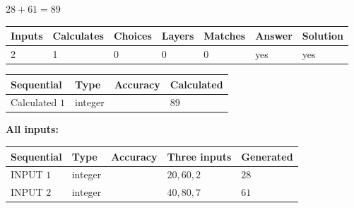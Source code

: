 \documentclass[12pt]{article}
\begin{document}
 
\noindent{}
 
 

$ %
28 +  %
61=   %
89$
 
 
\noindent{}
 
 

 
   
   
   
   
\noindent\begin{tabular}{|l|l|l|l|l|l|l|}
 \hline
Inputs & Calculates & Choices & Layers & Matches & Answer & Solution \\ \hline
 2  & 
 1  & 
 0
  & 
 0  & 
 0  & 
  yes & 
  yes 
  \\ \hline
 \end{tabular}
   
   
   
   
\noindent{}
   
   
  
  
\noindent\begin{tabular}{|l|l|l|l|}
\hline
 Sequential & Type & Accuracy & Calculated \\ 
\hline
 
 
  Calculated $  1 $ & integer &  & 
  $ 89 $ 
 \\  \hline  
 \end{tabular}
   
   
   
   
\noindent\vspace{0.1in}\hspace{-0.08in} {\textbf{\Large{All inputs: }}}
   
   
  
  
\noindent\begin{tabular}{|l|l|l|l|l|}
\hline
 Sequential & Type & Accuracy & Three inputs & Generated \\ 
\hline
 
 
  INPUT $  1 $ & integer &  & $
 20
 , 
 60
 , 
 2
 $ & $ 28 $ 
 \\  \hline  
 
 
  INPUT $  2 $ & integer &  & $
 40
 , 
 80
 , 
 7
 $ & $ 61 $ 
 \\  \hline  
 \end{tabular}
   
   
  
\end{document}
